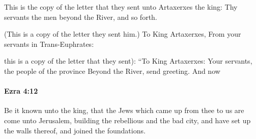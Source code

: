 			\begin{versebox}
					\item[BHS] 
					\item[LXX] 
					\item[ASV] This is the copy of the letter that they sent unto Artaxerxes the king: Thy servants the men beyond the River, and so forth.
					\item[NIV] (This is a copy of the letter they sent him.) To King Artaxerxes, From your servants in Trans-Euphrates:
					\item[NRSV] this is a copy of the letter that they sent): “To King Artaxerxes: Your servants, the people of the province Beyond the River, send greeting. And now
			\end{versebox}

		\paragraph{Ezra 4:12} %
			\label{EZRA-4-12}

			Be it known unto the king, that the Jews which came up from thee to us are come unto Jerusalem, building the rebellious and the bad city, and have set up the walls thereof, and joined the foundations.

